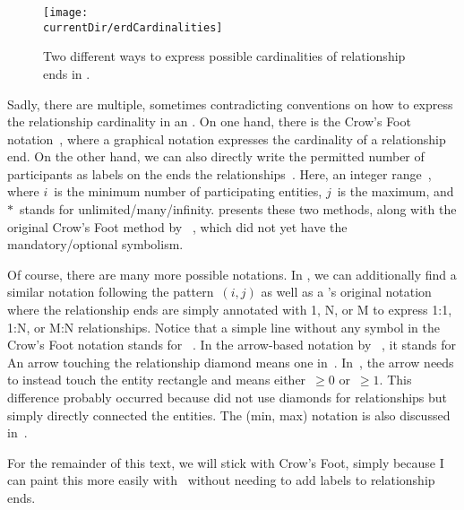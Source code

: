 \begin{figure}%
\centering%
\texttt{[image: \\currentDir/erdCardinalities]}%
\caption{Two different ways to express possible cardinalities of relationship ends in .}%
\label{fig:erdCardinalities}%
\end{figure}%
%
Sadly, there are multiple, sometimes contradicting conventions on how to express the relationship cardinality in an .
On one hand, there is the Crow's Foot notation~\cite{E1976BDSMEWACE,CM2000MDMAUDA,S2024D:CDMERDE}, where a graphical notation expresses the cardinality of a relationship end.
On the other hand, we can also directly write the permitted number of participants as labels on the ends the relationships~\cite{P2006CITRD:ERMI}.
Here, an integer range~, where $i$~is the minimum number of participating entities, $j$~is the maximum, and $*$~stands for unlimited/many/infinity.
 presents these two methods, along with the original Crow's Foot method by \citeauthor{E1976BDSMEWACE}~\cite{E1976BDSMEWACE}, which did not yet have the mandatory/optional symbolism.

Of course, there are many more possible notations.
In \cite{SS2005EIDDDFDB:CDDICAMP}, we can additionally find a similar notation following the pattern~$(i,j)$ as well as a \citeauthor{C1976TERMTAUVOD}'s original  notation~\cite{C1976TERMTAUVOD} where the relationship ends are simply annotated with 1, N, or M to express 1:1, 1:N, or M:N relationships.
Notice that a simple line without any symbol in the Crow's Foot notation stands for ~\cite{S2024D:CDMERDE}.
In the arrow-based notation by \citeauthor{B1969DSD}~\cite{B1969DSD}, it stands for 
An arrow touching the relationship diamond means one in~\cite{V1999C5DMS:CDUTERM}.
In~\cite{G2011EW2ITDS:CMUTERM}, the arrow needs to instead touch the entity rectangle and means either~$\geq0$ or~$\geq1$.
This difference probably occurred because \citeauthor{B1969DSD} did not use diamonds for relationships but simply directly connected the entities.
The (min, max) notation is also discussed in~\cite{G2011EW2ITDS:CMUTERM}.

For the remainder of this text, we will stick with Crow's Foot, simply because I can paint this more easily with \yEd\ without needing to add labels to relationship ends.%
%
\FloatBarrier%
\endhsection%
%
